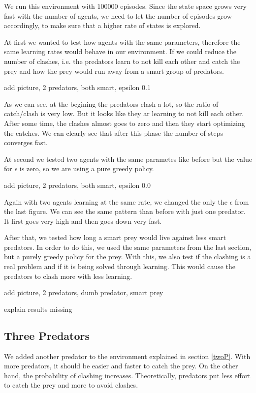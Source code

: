\documentclass{article}
\begin{document}
We run this environment with $100000$ episodes. Since the state space grows
very fast with the number of agents, we need to let the number of episodes grow
accordingly, to make sure that a higher rate of states is explored.

At first we wanted to test how agents with the same parameters, therefore
the same learning rates would behave in our environment. If we could reduce the
number of clashes, i.e. the predators learn to not kill each other and catch the
prey and how the prey would run away from a smart group of predators.

\error add picture, 2 predators, both smart, epsilon 0.1

As we can see, at the begining the predators clash a lot, so the ratio of
catch/clash is very low. But it looks like they ar learning to not kill each
other. After some time, the clashes almost goes to zero and then they start
optimizing the catches. We can clearly see that after this phase the number of
steps converges fast.


At second we tested two agents with the same parametes like before but the value
for $\epsilon$ is zero, so we are using a pure greedy policy.

\error add picture, 2 predators, both smart, epsilon 0.0

Again with two agents learning at the same rate, we changed the only the
$\epsilon$ from the last figure. We can see the same pattern than before with
just one predator. It first goes very high and then goes down very fast.

After that, we tested how long a smart prey would live against less smart
predators. In order to do this, we used the same parameters from the last section, but a purely greedy policy for the prey.
With this, we also test if the clashing is a real problem and if it is being solved
through learning. This would cause the predators to clash more with less
learning. 

\error add picture, 2 predators, dumb predator, smart prey

\error explain results missing


\subsection{Three Predators}
We added another predator to the environment explained in  section \ref{twoP}.
With more predators, it should be easier and faster to catch the prey. On the
other hand, the probability of clashing increases. Theoretically, predators put
less effort to catch the prey and more to avoid clashes.
\end{document}
